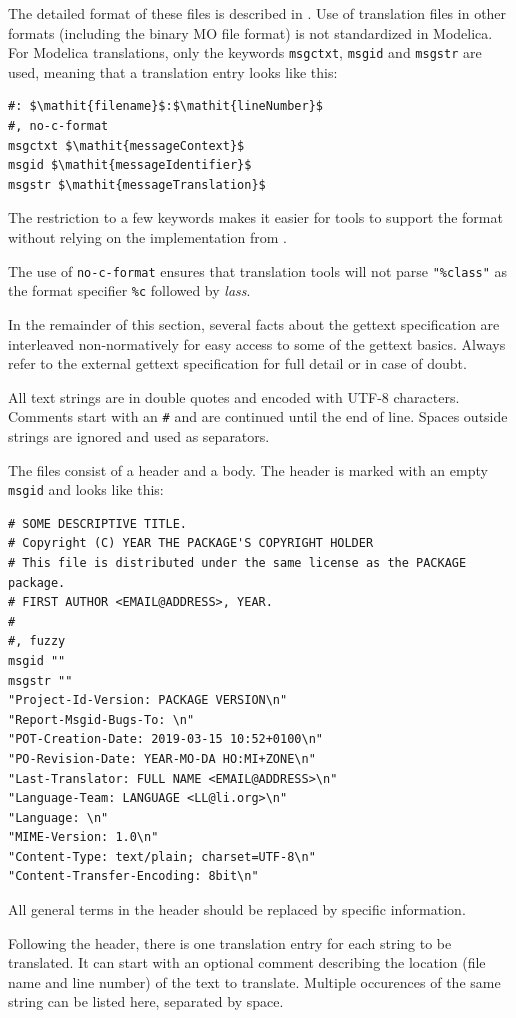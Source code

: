 The detailed format of these files is described in \textcite{GettextManual}.
Use of translation files in other formats (including the binary MO file format) is not standardized in Modelica.
For Modelica translations, only the keywords \lstinline!msgctxt!, \lstinline!msgid! and \lstinline!msgstr! are used, meaning that a translation entry looks like this:
\begin{lstlisting}
#: $\mathit{filename}$:$\mathit{lineNumber}$
#, no-c-format
msgctxt $\mathit{messageContext}$
msgid $\mathit{messageIdentifier}$
msgstr $\mathit{messageTranslation}$
\end{lstlisting}
The restriction to a few keywords makes it easier for tools to support the format without relying on the implementation from \textcite{GettextManual}.

The use of \lstinline!no-c-format! ensures that translation tools will not parse \lstinline!"%class"! as the format specifier \lstinline!%c! followed by \emph{lass}.

\begin{nonnormative}
In the remainder of this section, several facts about the gettext specification are interleaved non-normatively for easy access to some of the gettext basics.
Always refer to the external gettext specification for full detail or in case of doubt.

All text strings are in double quotes and encoded with UTF-8 characters.
Comments start with an \lstinline!#! and are continued until the end of line.
Spaces outside strings are ignored and used as separators.

The files consist of a header and a body.
The header is marked with an empty \lstinline!msgid! and looks like this:
\begin{lstlisting}
# SOME DESCRIPTIVE TITLE.
# Copyright (C) YEAR THE PACKAGE'S COPYRIGHT HOLDER
# This file is distributed under the same license as the PACKAGE package.
# FIRST AUTHOR <EMAIL@ADDRESS>, YEAR.
#
#, fuzzy
msgid ""
msgstr ""
"Project-Id-Version: PACKAGE VERSION\n"
"Report-Msgid-Bugs-To: \n"
"POT-Creation-Date: 2019-03-15 10:52+0100\n"
"PO-Revision-Date: YEAR-MO-DA HO:MI+ZONE\n"
"Last-Translator: FULL NAME <EMAIL@ADDRESS>\n"
"Language-Team: LANGUAGE <LL@li.org>\n"
"Language: \n"
"MIME-Version: 1.0\n"
"Content-Type: text/plain; charset=UTF-8\n"
"Content-Transfer-Encoding: 8bit\n"
\end{lstlisting}
All general terms in the header should be replaced by specific information.

Following the header, there is one translation entry for each string to be translated.
It can start with an optional comment describing the location (file name and line number) of the text to translate.
Multiple occurences of the same string can be listed here, separated by space.
\end{nonnormative}

